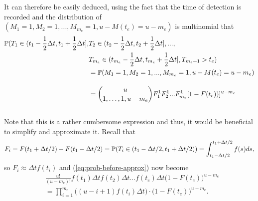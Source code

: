 It can therefore be easily deduced, using the fact that the time of detection is recorded and the distribution of $(M_1 = 1 , M_2 = 1 ,...,M_{m_e} = 1, u - M(t_e) = u - m_e)$ is multinomial that
\begin{equation}\label{eq:prob-before-approx}
\begin{aligned}
    \mathbb{P}(T_1 \in (t_1 - \frac{1}{2}\Delta t, t_1 + \frac{1}{2}\Delta t], &T_2 \in (t_2 - \frac{1}{2}\Delta t, t_2 + \frac{1}{2}\Delta t],...,\\&T_{m_e} \in (t_{m_e} - \frac{1}{2}\Delta t, t_{m_e} + \frac{1}{2}\Delta t],T_{m_e + 1} > t_e) 
    \\&= \mathbb{P}(M_1 = 1 , M_2 = 1 ,...,M_{m_e} = 1, u - M(t_e) = u - m_e)\\[10pt]
    &= {u\choose 1,\dots,1,u-m_e}F_1^1F_2^1...F_{m_e}^1[1-F(t_e))]^{u-m_e}\\[10pt]
\end{aligned}
\end{equation}

Note that this is a rather cumbersome expression and thus, it would be beneficial to simplify and approximate it. Recall that 
$$
F_i = F(t_1 + \Delta t/2) - F(t_1 - \Delta t/2) = \mathbb{P}(T_i \in (t_1 - \Delta t/2, t_1 + \Delta t/2)) = \int_{t_1 - \Delta t/2}^{t_1 + \Delta t/2} f(s) ds,
$$ 
so $F_i\approx \Delta t f(t_i)$ and (\ref{eq:prob-before-approx}) now become 
\begin{equation}\label{eq:prob-after-approx}
\begin{aligned}
    &\frac{u!}{(u - m_e)!}f(t_1)\Delta t f(t_2)\Delta t ... f(t_e)\Delta t \big(1 - F(t_e)\big)^{u-m_e}\\[10pt]
    &= \prod_{i=1}^{m_e}\big((u-i + 1)f(t_i)\Delta t\big) \cdot \big(1 - F(t_e)\big)^{u-m_e}.
\end{aligned}
\end{equation}

